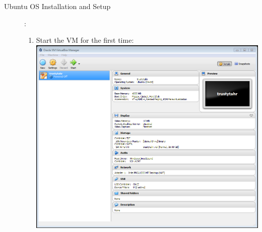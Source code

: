 \documentclass[12pt]{article}
\begin{document}
\begin{description}
\begin{enumerate}
\begin{itemize}
            \end{itemize}
	\newpage

\end{enumerate}

		\item[Ubuntu OS Installation and Setup]: \vspace{20mm} \\

\begin{enumerate}
\item Start the VM for the first time: \vspace{20mm} \\
      		\includegraphics[scale=.6]{Capture7.png}\\
            \begin{itemize}
                    

\end{itemize}
\end{enumerate}
\end{description}
\end{document}
